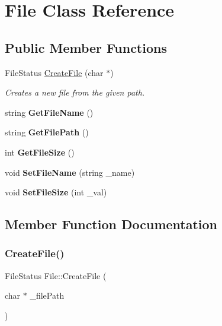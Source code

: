\hypertarget{class_file}{}\section{File Class Reference}
\label{class_file}
\subsection*{Public Member Functions}
\begin{DoxyCompactItemize}
\item 
File\+Status \mbox{\hyperlink{class_file_a9f15cc1e3e67cf2def80ee6d1c885f2f}{Create\+File}} (char $\ast$)
\begin{DoxyCompactList}\small\item\em Creates a new file from the given path. \end{DoxyCompactList}\item 
\mbox{\label{class_file_a752327abcca875737cf92e1d4a87f97e}} 
string {\bfseries Get\+File\+Name} ()
\item 
\mbox{\label{class_file_af454c0df4f4094da25036bbabfa26dc8}} 
string {\bfseries Get\+File\+Path} ()
\item 
\mbox{\label{class_file_a1b17dc347fae9dec28fab32c4d94acde}} 
int {\bfseries Get\+File\+Size} ()
\item 
\mbox{\label{class_file_a52789d87184ed40ef0e2019878f8e3ae}} 
void {\bfseries Set\+File\+Name} (string \+\_\+name)
\item 
\mbox{\label{class_file_ae529b31014cff04aa7daba147884320e}} 
void {\bfseries Set\+File\+Size} (int \+\_\+val)
\end{DoxyCompactItemize}


\subsection{Member Function Documentation}
\mbox{\label{class_file_a9f15cc1e3e67cf2def80ee6d1c885f2f}} 
\subsubsection{\texorpdfstring{Create\+File()}{CreateFile()}}
{\footnotesize\ttfamily File\+Status File\+::\+Create\+File (\begin{DoxyParamCaption}\item[{char $\ast$}]{\+\_\+file\+Path }\end{DoxyParamCaption})}



